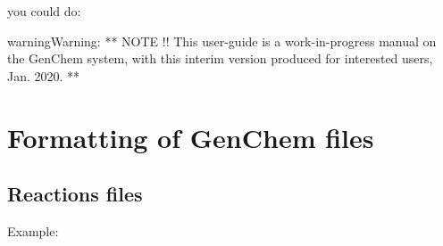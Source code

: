 \documentclass[a4paper,10pt,english]{sphinxmanual}
\begin{document}
you could do:

\begin{sphinxVerbatim}[commandchars=\\\{\}]
    

   
\end{sphinxVerbatim}

\begin{sphinxadmonition}{warning}{Warning:}
**  NOTE !!
This user-guide is a work-in-progress manual on the GenChem system,
with this interim version produced for interested users, Jan. 2020.
**
\end{sphinxadmonition}


\chapter{Formatting of GenChem files}
\label{\detokenize{GenChemDoc_chem:formatting-of-genchem-files}}\label{\detokenize{GenChemDoc_chem::doc}}

\section{Reactions files}
\label{\detokenize{GenChemDoc_chem:reactions-files}}
Example:
\end{document}
